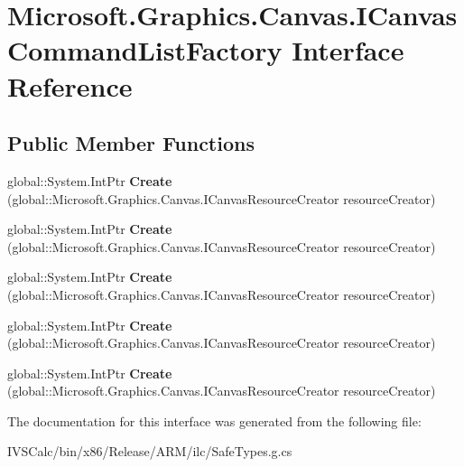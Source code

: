 \hypertarget{interface_microsoft_1_1_graphics_1_1_canvas_1_1_i_canvas_command_list_factory}{}\section{Microsoft.\+Graphics.\+Canvas.\+I\+Canvas\+Command\+List\+Factory Interface Reference}
\label{interface_microsoft_1_1_graphics_1_1_canvas_1_1_i_canvas_command_list_factory}
\subsection*{Public Member Functions}
\begin{DoxyCompactItemize}
\item 
\mbox{\label{interface_microsoft_1_1_graphics_1_1_canvas_1_1_i_canvas_command_list_factory_a1b734b5d6d9ecf9a63aa155bede5d500}} 
global\+::\+System.\+Int\+Ptr {\bfseries Create} (global\+::\+Microsoft.\+Graphics.\+Canvas.\+I\+Canvas\+Resource\+Creator resource\+Creator)
\item 
\mbox{\label{interface_microsoft_1_1_graphics_1_1_canvas_1_1_i_canvas_command_list_factory_a1b734b5d6d9ecf9a63aa155bede5d500}} 
global\+::\+System.\+Int\+Ptr {\bfseries Create} (global\+::\+Microsoft.\+Graphics.\+Canvas.\+I\+Canvas\+Resource\+Creator resource\+Creator)
\item 
\mbox{\label{interface_microsoft_1_1_graphics_1_1_canvas_1_1_i_canvas_command_list_factory_a1b734b5d6d9ecf9a63aa155bede5d500}} 
global\+::\+System.\+Int\+Ptr {\bfseries Create} (global\+::\+Microsoft.\+Graphics.\+Canvas.\+I\+Canvas\+Resource\+Creator resource\+Creator)
\item 
\mbox{\label{interface_microsoft_1_1_graphics_1_1_canvas_1_1_i_canvas_command_list_factory_a1b734b5d6d9ecf9a63aa155bede5d500}} 
global\+::\+System.\+Int\+Ptr {\bfseries Create} (global\+::\+Microsoft.\+Graphics.\+Canvas.\+I\+Canvas\+Resource\+Creator resource\+Creator)
\item 
\mbox{\label{interface_microsoft_1_1_graphics_1_1_canvas_1_1_i_canvas_command_list_factory_a1b734b5d6d9ecf9a63aa155bede5d500}} 
global\+::\+System.\+Int\+Ptr {\bfseries Create} (global\+::\+Microsoft.\+Graphics.\+Canvas.\+I\+Canvas\+Resource\+Creator resource\+Creator)
\end{DoxyCompactItemize}


The documentation for this interface was generated from the following file\+:\begin{DoxyCompactItemize}
\item 
I\+V\+S\+Calc/bin/x86/\+Release/\+A\+R\+M/ilc/Safe\+Types.\+g.\+cs\end{DoxyCompactItemize}
